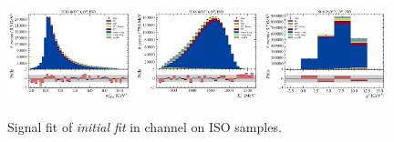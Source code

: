 \begin{figure}[htb]
    \centering
    \includegraphics[width=0.32\textwidth]{./figs-supplemental-plots/init-fit/sig/fit_result-stacked-D0-iso-mmiss2.pdf}
    \includegraphics[width=0.32\textwidth]{./figs-supplemental-plots/init-fit/sig/fit_result-stacked-D0-iso-el.pdf}
    \includegraphics[width=0.32\textwidth]{./figs-supplemental-plots/init-fit/sig/fit_result-stacked-D0-iso-q2.pdf}

    \caption{
        Signal fit of \emph{initial fit} in \Dz channel on ISO samples.
    }
    \label{fig:init-fit-sig-d0}
\end{figure}


